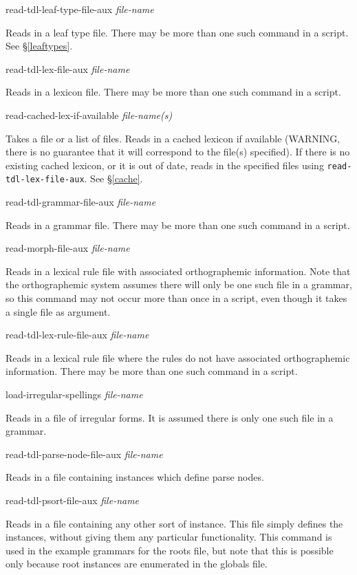 \documentclass[12pt]{report}
\newcommand{\lispcommand}[1]{\noindent\rm #1}%
\begin{document}
\lispcommand{read-tdl-leaf-type-file-aux {\it file-name}}

Reads in a leaf type file.  There may be more than one such command
in a script.
See \S\ref{leaftypes}.

\lispcommand{read-tdl-lex-file-aux {\it file-name}}

Reads in a lexicon file. There may be more than one such command
in a script.

\lispcommand{read-cached-lex-if-available {\it file-name(s)}}

Takes a file or a list of files.
Reads in a cached lexicon if available (WARNING, there is no
guarantee that it will correspond to the file(s) specified).
If there is no existing cached lexicon, or it is out of date,
reads in the specified files using {\tt read-tdl-lex-file-aux}.
See \S\ref{cache}.

\lispcommand{read-tdl-grammar-file-aux {\it file-name}}

Reads in a grammar file. There may be more than one such command
in a script.

\lispcommand{read-morph-file-aux {\it file-name}}

Reads in a lexical rule file with associated orthographemic information.
Note that the orthographemic system assumes there will only
be one such file in a grammar, so this command
may not occur more than once in a script, even 
though it takes a single file as argument.

\lispcommand{read-tdl-lex-rule-file-aux {\it file-name}}

Reads in a lexical rule file where the rules do not have
associated orthographemic information.
There may be more than one such command
in a script.

\lispcommand{load-irregular-spellings {\it file-name}}

Reads in a file of irregular forms.  It is assumed there is
only one such file in a grammar.

\lispcommand{read-tdl-parse-node-file-aux {\it file-name}}

Reads in a file containing instances which define parse nodes.

\lispcommand{read-tdl-psort-file-aux {\it file-name}}

Reads in a file containing any other sort of instance.  
This file simply defines the instances, without giving them
any particular functionality.
This command is used
in the example grammars for the
roots file, but note that this is possible only because root instances
are enumerated in the globals file.
\end{document}
